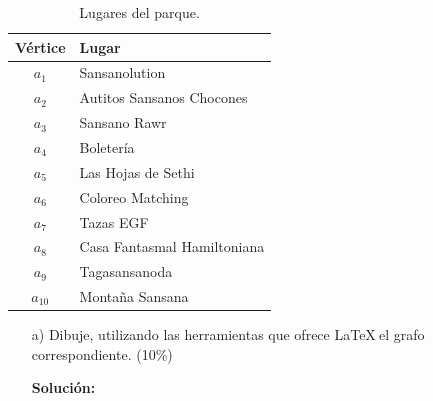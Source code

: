 \documentclass[letterpaper,10pt]{article}
\begin{document}
\begin{enumerate}
\begin{minipage}[h]{0.36\textwidth}
\begin{table}[H]
\begin{center}
        \end{center}
    \end{table}
    
    \end{minipage}
    \hfill
    \begin{minipage}[h]{0.40\textwidth}
    \footnotesize
    \begin{table}[H]
        \begin{center}
            
            \begin{tabular}{|c|l|}
            \hline
            \textbf{Vértice} & \textbf{Lugar}\\ \hline
            $a_1$ & Sansanolution\\
            $a_2$ & Autitos Sansanos Chocones\\
            $a_3$ & Sansano Rawr\\
            $a_4$ & Boletería\\
            $a_5$ & Las Hojas de Sethi\\
            $a_6$ & Coloreo Matching\\
            $a_7$ & Tazas EGF\\
            $a_8$ & Casa Fantasmal Hamiltoniana\\
            $a_9$ & Tagasansanoda\\
            $a_{10}$ & Montaña Sansana\\
            \hline
            \end{tabular}
        \caption{Lugares del parque.}\label{tab:atracciones}
        \end{center}
    \end{table}
    \end{minipage}
    \begin{itemize}
        \item[a) ]Dibuje, utilizando las herramientas que ofrece \LaTeX  $~$el grafo correspondiente. (10\%)
        
        \textbf{Solución:}
        \begin{center}
            \begin{minipage}{0.9\textwidth}
            \centering
\end{minipage}
\end{center}
\end{itemize}
\end{enumerate}
\end{document}
